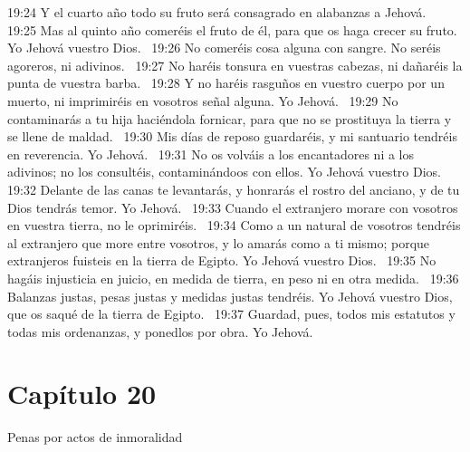 19:24 Y el cuarto año todo su fruto será consagrado en alabanzas a Jehová.  
19:25 Mas al quinto año comeréis el fruto de él, para que os haga crecer su fruto. Yo Jehová vuestro Dios.  
19:26 No comeréis cosa alguna con sangre. No seréis agoreros, ni adivinos.  
19:27 No haréis tonsura en vuestras cabezas, ni dañaréis la punta de vuestra barba.  
19:28 Y no haréis rasguños en vuestro cuerpo por un muerto, ni imprimiréis en vosotros señal alguna. Yo Jehová.  
19:29 No contaminarás a tu hija haciéndola fornicar,  para que no se prostituya la tierra y se llene de maldad.  
19:30 Mis días de reposo guardaréis, y mi santuario tendréis en reverencia. Yo Jehová.  
19:31 No os volváis a los encantadores ni a los adivinos; no los consultéis, contaminándoos con ellos. Yo Jehová vuestro Dios.  
19:32 Delante de las canas te levantarás, y honrarás el rostro del anciano, y de tu Dios tendrás temor. Yo Jehová.  
19:33 Cuando el extranjero morare con vosotros en vuestra tierra, no le oprimiréis.  
19:34 Como a un natural de vosotros tendréis al extranjero que more entre vosotros, y lo amarás como a ti mismo; porque extranjeros fuisteis en la tierra de Egipto. Yo Jehová vuestro Dios.  
19:35 No hagáis injusticia en juicio, en medida de tierra, en peso ni en otra medida.  
19:36 Balanzas justas, pesas justas y medidas justas tendréis. Yo Jehová vuestro Dios, que os saqué de la tierra de Egipto.  
19:37 Guardad, pues, todos mis estatutos y todas mis ordenanzas, y ponedlos por obra. Yo Jehová. 
\section*{Capítulo 20 }
Penas por actos de inmoralidad  

